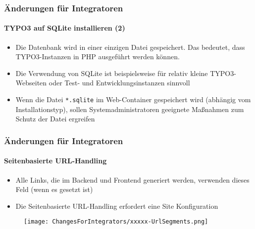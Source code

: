 \begin{frame}[fragile]
	\frametitle{Änderungen für Integratoren}
	\framesubtitle{TYPO3 auf SQLite installieren (2)}

	\begin{itemize}
		\item Die Datenbank wird in einer einzigen Datei gespeichert. Das bedeutet, dass 
			TYPO3-Instanzen in PHP ausgeführt werden können.
		\item Die Verwendung von SQLite ist beispielsweise für relativ kleine TYPO3-Webseiten
			oder Test- und Entwicklungsinstanzen sinnvoll
		\item Wenn die Datei \texttt{*.sqlite} im Web-Container gespeichert wird (abhängig vom Installationstyp),
			  sollen Systemadministratoren geeignete Maßnahmen zum Schutz der Datei 
			ergreifen
	\end{itemize}

\end{frame}


\begin{frame}[fragile]
	\frametitle{Änderungen für Integratoren}
	\framesubtitle{Seitenbasierte URL-Handling}

	\begin{itemize}
		\item Alle Links, die im Backend und Frontend generiert werden, verwenden dieses Feld
			(wenn es gesetzt ist)
		\item Die Seitenbasierte URL-Handling erfordert eine Site Konfiguration
	\end{itemize}

	\begin{figure}
		\texttt{[image: ChangesForIntegrators/xxxxx-UrlSegments.png]}
	\end{figure}

\end{frame}


